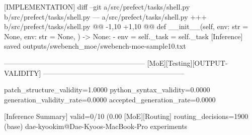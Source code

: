 [IMPLEMENTATION]
diff --git a/src/prefect/tasks/shell.py b/src/prefect/tasks/shell.py --- a/src/prefect/tasks/shell.py +++ b/src/prefect/tasks/shell.py @@ -1,10 +1,10 @@ def __init__(self, env: str = None, env: str = None, ) -> None: - env = self._task = self._task
[Inference] saved outputs/swebench_moe/swebench-moe-sample10.txt

------------------------------------------------------------
[MoE][Testing][OUTPUT-VALIDITY]
------------------------------------------------------------

patch_structure_validity=1.0000
python_syntax_validity=0.0000
generation_validity_rate=0.0000
accepted_generation_rate=0.0000

[Inference Summary] valid=0/10 (0.00%
[MoE][Routing] routing_decisions=1900
(base) dae-kyookim@Dae-Kyoos-MacBook-Pro experiments %